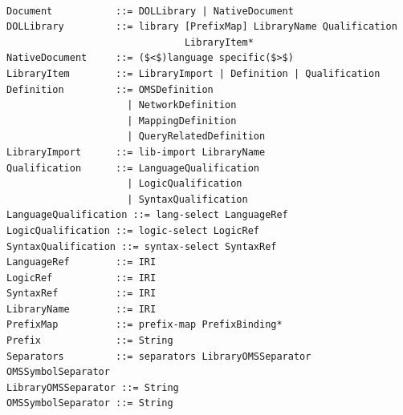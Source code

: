 \documentclass[10pt, a4paper]{isov2}
\makeatletter
\newcommand*{\eg}{e.g.\@\xspace}
\newcommand*\CommentAuthor{}
\renewcommand*\CommentAuthor{#1}}
\newcommand*\CommentDate{}
\renewcommand*\CommentDate{#1}}
\newcommand*\CommentId{}
\renewcommand*\CommentId{#1}}
\newcommand*\CommentType{}
\renewcommand*\CommentType{#1}}
\newcommand*{\SetCommentColorByType}[1]{%
\edef\localType{{#1}}%
\expandafter\ifstrequal\localType{q-aut}{\colorlet{CommentColor}{red}}{%
\expandafter\ifstrequal\localType{q-all}{\colorlet{CommentColor}{orange}}{%
\expandafter\ifstrequal\localType{todo}{\colorlet{CommentColor}{orange}}{%
\expandafter\ifstrequal\localType{fyi}{\colorlet{CommentColor}{lightgray}}{%
\colorlet{CommentColor}{yellow}}}}}}
\newcommand*{\SetCommentPrefixByType}[1]{%
\edef\localType{{#1}}%
\expandafter\@ifmtarg\localType{%
\edef\CommentPrefix{}%
}{%
\caseupper[q]{#1}%
\edef\CommentPrefix{\thestring: }%
}}
\newcommand*{\initComment}[1]{%
\setkeys{Comment}{#1}%
\SetCommentColorByType{\CommentType}%
\relax%
\SetCommentPrefixByType{\CommentType}%
\relax%
}
\newcommand*{\todonote}[2][]{%
\initComment{#1}%
\pdfcomment[author=\CommentAuthor,color=CommentColor,date=\CommentDate,id=\CommentId]{%
\CommentPrefix
#2}}
\renewcommand*{\todonote}[2][]{%
\initComment{#1}%
\ednote{\CommentPrefix #2}}
\renewcommand*{\textLF}{\\}
\makeatother
\begin{document}



\label{e:libraries}
\begin{lstlisting}[language=ebnf,escapeinside={()}]  % abstract syntax

Document           ::= DOLLibrary | NativeDocument
DOLLibrary         ::= library [PrefixMap] LibraryName Qualification
                               LibraryItem*
NativeDocument     ::= ($<$)language specific($>$) 
LibraryItem        ::= LibraryImport | Definition | Qualification
Definition         ::= OMSDefinition
                     | NetworkDefinition
                     | MappingDefinition
                     | QueryRelatedDefinition
LibraryImport      ::= lib-import LibraryName
Qualification      ::= LanguageQualification
                     | LogicQualification
                     | SyntaxQualification
LanguageQualification ::= lang-select LanguageRef
LogicQualification ::= logic-select LogicRef
SyntaxQualification ::= syntax-select SyntaxRef
LanguageRef        ::= IRI
LogicRef           ::= IRI
SyntaxRef          ::= IRI
LibraryName        ::= IRI
PrefixMap          ::= prefix-map PrefixBinding*
Prefix             ::= String
Separators         ::= separators LibraryOMSSeparator OMSSymbolSeparator
LibraryOMSSeparator ::= String
OMSSymbolSeparator ::= String
\end{lstlisting}


\end{document}
